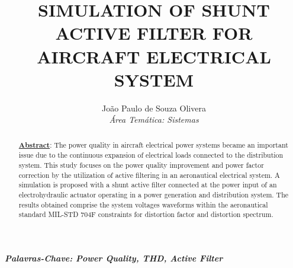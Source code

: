 \documentclass[]{seti2}
\title{\uppercase{Simulation of Shunt Active Filter for Aircraft Electrical System}}
\author{
					João Paulo de Souza Olivera\\
					{\normalsize\itshape Área Temática: Sistemas}\\
				}
\begin{document}
\maketitle

\begin{abstract}
		\underline{\textbf{Abstract}}: The power quality in aircraft electrical power systems became an important issue due to the continuous expansion of electrical loads connected to the distribution system. This study focuses on the power quality improvement and power factor correction by the utilization of active filtering in an aeronautical electrical system. A simulation is proposed with a shunt active filter connected at the power input of an electrohydraulic actuator operating in a power generation and distribution system. The results obtained comprise the system voltages waveforms within the aeronautical standard MIL-STD 704F constraints for distortion factor and distortion spectrum.
\end{abstract}

\textbf{\textit{Palavras-Chave: Power Quality, THD, Active Filter}}








\newpage

\end{document}
